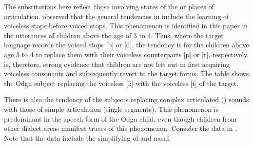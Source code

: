 \documentclass[output=paper,
modfonts
]{langscibook}
\begin{document}
The substitutions here reflect those involving states of the  or places of articulation. \citet[16]{Hyman1975} observed that the general tendencies in  include the learning of voiceless stops before voiced stops. This phenomenon is identified in this paper in the utterances of children above the age of 3 to 4. Thus, where the target language records the voiced stops [b] or [d], the tendency is for the children above age 3 to 4 to replace them with their voiceless counterparts [p] or [t], respectively.  is, therefore, strong evidence that  children are not left out in first acquiring voiceless consonants and subsequently revert to the target forms. The table shows the Odgn subject replacing the voiceless   [k] with the voiceless   [t] of the target.

\begin{table}

\caption{d → t: b → p, k → t.}
\label{tab:alerechi:9}
\end{table}

There is also the tendency of the  subjects replacing complex articulated () sounds with those of simple articulation (single segments). This phenomenon is predominant in the speech form of the Odgn child, even though children from other dialect areas manifest traces of this phenomenon. Consider the data in . Note that the data include the simplifying of   and nasal.
\end{document}
